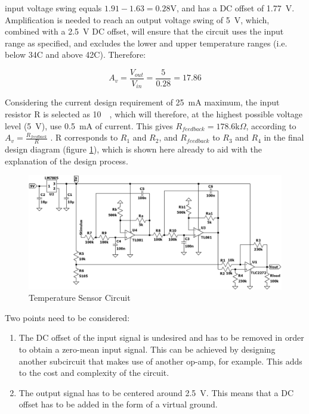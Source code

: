 input voltage swing equals $1.91 - 1.63 = 0.28$V, and has a DC offset of \SI{1.77}{\volt}. Amplification is needed to reach an output voltage swing of \SI{5}{\volt}, which, combined with a \SI{2.5}{V} DC offset, will ensure that the circuit uses the input range as specified, and excludes the lower and upper temperature ranges (i.e. below 34\degree C and above 42\degree C). Therefore:

$$A_v = \frac{V_{out}}{V_{in}} = \frac{5}{0.28} = 17.86$$

Considering the current design requirement of \SI{25}{mA} maximum, the input resistor R is selected as \SI{10}{\kilo \Omega}, which will therefore, at the highest possible voltage level (\SI{5}{\volt}), use \SI{0.5}{mA} of current.  This gives $R_{feedback} = 178.6$k$\Omega$, according to $A_v = \frac{{R}_{feedback}}{R}$ \cite{opamp}. R corresponds to $R_1$ and $R_2$, and $R_{feedback}$ to $R_{3}$ and $R_4$ in the final design diagram (figure \ref{fig:final}), which is shown here already to aid with the explanation of the design process. 

\begin{figure}[H]
    \centering
    \includegraphics[width = 1\textwidth]{Figures/final.png}
    \caption{Temperature Sensor Circuit}
    \label{fig:final}
\end{figure}

Two points need to be considered: 
\begin{enumerate}
\item The DC offset of the input signal is undesired and has to be removed in order to obtain a zero-mean input signal. This can be achieved by designing another subcircuit that makes use of another op-amp, for example. This adds to the cost and complexity of the circuit.
\item The output signal has to be centered around \SI{2.5}{\volt}. This means that a DC offset has to be added in the form of a virtual ground.
\end{enumerate}

